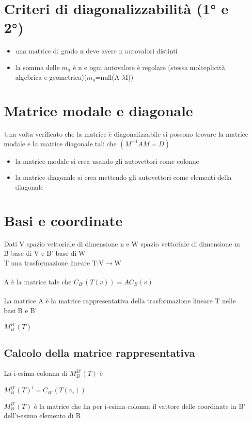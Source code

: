 \documentclass{article}
\begin{document}
\section{Criteri di diagonalizzabilità (1° e 2°)}
\begin{itemize}
    \item una matrice di grado n deve avere n autovalori distinti
    \item la somma delle \(m_a\) è n e ogni autovalore è regolare (stessa molteplicità algebrica e geometrica)(\(m_g\)=null(A-\(\lambda\)I))
\end{itemize}

\section{Matrice modale e diagonale}
{\large Una volta verificato che la matrice è diagonalizzabile si possono trovare la matrice modale e la matrice diagonale tali che 
\( (M^{-1}AM=D) \)}
\begin{itemize}
    \item la matrice modale si crea usando gli autovettori come colonne
    \item la matrice diagonale si crea mettendo gli autovettori come elementi della diagonale
\end{itemize}

\section{Basi e coordinate}
Dati V spazio vettoriale di dimensione n e W spazio vettoriale di dimensione m\\
B base di V e B' base di W\\
T una trasformazione lineare T:V\(\rightarrow{}\)W\\\\
{\large A è la matrice tale che \(C_{B'}(T(v))=AC_{B}(v)\)}\\\\
La matrice A è la matrice rappresentativa della trasformazione lineare T nelle basi B e B'\\
\begin{center}
    \(M^{B'}_B(T)\)
\end{center}
\subsection{Calcolo della matrice rappresentativa}
La i-esima colonna di \(M^{B'}_B(T)\) è\\
\begin{center}
    \(M^{B'}_B(T)^i=C_{B'}(T(v_i))\)
\end{center}
\(M^{B'}_B(T)\) è la matrice che ha per i-esima colonna il vattore delle coordinate in B' dell'i-esimo elemento di B\\
\end{document}
